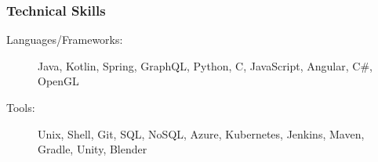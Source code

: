 \documentclass{article}
\begin{document}

\subsubsection*{Technical Skills}
    \begin{description}    
        \item[Languages/Frameworks:] 
            Java, 
            Kotlin,
            Spring,
            GraphQL,
            Python,
            C,
            JavaScript,
            Angular,
            C\#,
            OpenGL

            \vspace{0.5em}

        \item[Tools:] 
            Unix,
            Shell,
            Git,
            SQL,
            NoSQL,
            Azure,
            Kubernetes,
            Jenkins,
            Maven,
            Gradle,
            Unity,
            Blender
    \end{description}
\end{document}
